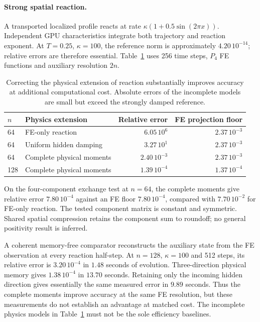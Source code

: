\documentclass[10pt,a4paper]{article}
\begin{document}
\paragraph{Strong spatial reaction.}
A transported localized profile reacts at rate
$\kappa(1+0.5\sin(2\pi x))$. Independent GPU characteristics integrate
both trajectory and reaction exponent. At $T=0.25$, $\kappa=100$,
the reference norm is approximately $4.20\,10^{-14}$; relative errors
are therefore essential. Table~\ref{tab:reaction} uses 256 time steps,
$P_4$ FE functions and auxiliary resolution $2n$.
\begin{table}[htbp]\centering
\begin{tabular}{llrr}\toprule
$n$ & Physics extension & Relative error & FE projection floor\\\midrule
64 & FE-only reaction & $6.05\,10^6$ & $2.37\,10^{-3}$\\
64 & Uniform hidden damping & $3.27\,10^1$ & $2.37\,10^{-3}$\\
64 & Complete physical moments & $2.40\,10^{-3}$ & $2.37\,10^{-3}$\\
128 & Complete physical moments & $1.39\,10^{-4}$ & $1.37\,10^{-4}$\\\bottomrule
\end{tabular}
\caption{Correcting the physical extension of reaction substantially
improves accuracy at additional computational cost. Absolute errors of
the incomplete models are small but exceed the strongly damped reference.}
\label{tab:reaction}
\end{table}
On the four-component exchange test at $n=64$, the complete moments give
relative error $7.80\,10^{-4}$ against an FE floor $7.80\,10^{-4}$,
compared with $7.70\,10^{-2}$ for FE-only reaction. The tested component
matrix is constant and symmetric. Shared spatial compression retains
the component sum to roundoff; no general positivity result is inferred.

A coherent memory-free comparator reconstructs the auxiliary state
from the FE observation at every reaction half-step. At $n=128$,
$\kappa=100$ and 512 steps, its relative error is $3.20\,10^{-4}$
in $1.48$ seconds of evolution. Three-direction physical memory gives
$1.38\,10^{-4}$ in $13.70$ seconds. Retaining only the incoming hidden
direction gives essentially the same measured error in $9.89$ seconds.
Thus the complete moments improve accuracy at the same FE resolution,
but these measurements do not establish an advantage at matched cost.
The incomplete physics models in Table~\ref{tab:reaction} must not be
the sole efficiency baselines.
\end{document}
